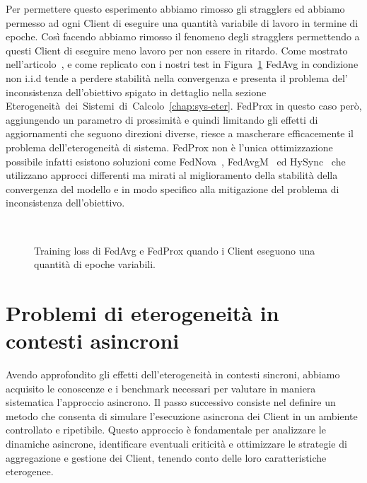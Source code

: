 \documentclass[a4paper, oneside, openright]{report}
\let\oldsection\section
\renewcommand{\section}{\newpage\oldsection}
\begin{document}
Per permettere questo esperimento abbiamo rimosso gli stragglers ed abbiamo permesso ad ogni Client di eseguire una quantità variabile di lavoro in termine di epoche. Così facendo abbiamo rimosso il fenomeno degli stragglers permettendo a questi Client di eseguire meno lavoro per non essere in ritardo. Come mostrato nell'articolo~\cite{DBLP:journals/corr/abs-1812-06127}, e come replicato con i nostri test in Figura~\ref{fig:var_ephocs} FedAvg in condizione non i.i.d tende a perdere stabilità nella convergenza e presenta il problema del' inconsistenza dell'obiettivo spigato in dettaglio nella sezione Eterogeneità~dei~Sistemi~di~Calcolo~\ref{chap:sys-eter}. FedProx in questo caso però, aggiungendo un parametro di prossimità e quindi limitando gli effetti di aggiornamenti che seguono direzioni diverse, riesce a mascherare efficacemente il problema dell'eterogeneità di sistema. FedProx non è l'unica ottimizzazione possibile infatti esistono soluzioni come FedNova~\cite{DBLP:journals/corr/abs-2007-07481}, FedAvgM~\cite{DBLP:journals/corr/abs-1909-06335} ed HySync~\cite{9407951} che utilizzano approcci differenti ma mirati al miglioramento della stabilità della convergenza del modello e in modo specifico alla mitigazione del problema di inconsistenza dell'obiettivo.

\begin{figure}
    \centering
     \\
    \hspace{0.45cm}
    \caption{Training loss di FedAvg e FedProx quando i Client eseguono una quantità di epoche variabili.}
    \label{fig:var_ephocs}
\end{figure}
 \section{Problemi di eterogeneità in contesti asincroni}
Avendo approfondito gli effetti dell'eterogeneità in contesti sincroni, abbiamo acquisito le conoscenze e i benchmark necessari per valutare in maniera sistematica l'approccio asincrono. Il passo successivo consiste nel definire un metodo che consenta di simulare l'esecuzione asincrona dei Client in un ambiente controllato e ripetibile. Questo approccio è fondamentale per analizzare le dinamiche asincrone, identificare eventuali criticità e ottimizzare le strategie di aggregazione e gestione dei Client, tenendo conto delle loro caratteristiche eterogenee.
\end{document}
